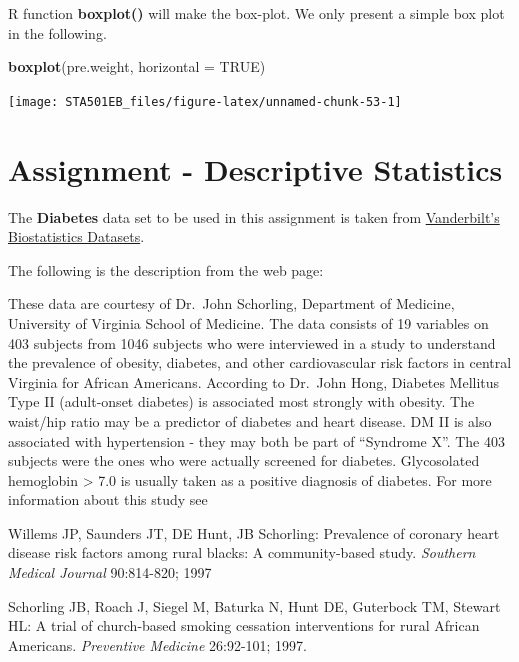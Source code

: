 \documentclass[
]{book}
\newenvironment{Shaded}{\begin{snugshade}}{\end{snugshade}}
\newcommand{\AttributeTok}[1]{\textcolor[rgb]{0.13,0.29,0.53}{#1}}
\newcommand{\ConstantTok}[1]{\textcolor[rgb]{0.56,0.35,0.01}{#1}}
\newcommand{\FunctionTok}[1]{\textcolor[rgb]{0.13,0.29,0.53}{\textbf{#1}}}
\newcommand{\NormalTok}[1]{#1}
\begin{document}
R function \textbf{boxplot()} will make the box-plot. We only present a simple box plot in the following.

\begin{Shaded}
\begin{Highlighting}[]
\FunctionTok{boxplot}\NormalTok{(pre.weight, }\AttributeTok{horizontal =} \ConstantTok{TRUE}\NormalTok{)}
\end{Highlighting}
\end{Shaded}

\begin{center}\texttt{[image: STA501EB\_files/figure-latex/unnamed-chunk-53-1]} \end{center}

\hypertarget{assignment---descriptive-statistics}{%
\section{Assignment - Descriptive Statistics}\label{assignment---descriptive-statistics}}

The \textbf{Diabetes} data set to be used in this assignment is taken from \href{https://hbiostat.org/data/}{Vanderbilt's Biostatistics Datasets}.

The following is the description from the web page:

These data are courtesy of Dr.~John Schorling, Department of Medicine, University of Virginia School of Medicine.
The data consists of 19 variables on 403 subjects from 1046 subjects who were interviewed in a study to understand the prevalence of obesity, diabetes, and other cardiovascular risk factors in central Virginia for African Americans. According to Dr.~John Hong, Diabetes Mellitus Type II (adult-onset diabetes) is associated most strongly with obesity. The waist/hip ratio may be a predictor of diabetes and heart disease. DM II is also associated with hypertension - they may both be part of ``Syndrome X''. The 403 subjects were the ones who were actually screened for diabetes. Glycosolated hemoglobin \textgreater{} 7.0 is usually taken as a positive diagnosis of diabetes. For more information about this study see

Willems JP, Saunders JT, DE Hunt, JB Schorling: Prevalence of coronary heart disease risk factors among rural blacks: A community-based study. \emph{Southern Medical Journal} 90:814-820; 1997

Schorling JB, Roach J, Siegel M, Baturka N, Hunt DE, Guterbock TM, Stewart HL: A trial of church-based smoking cessation interventions for rural African Americans. \emph{Preventive Medicine} 26:92-101; 1997.
\end{document}
